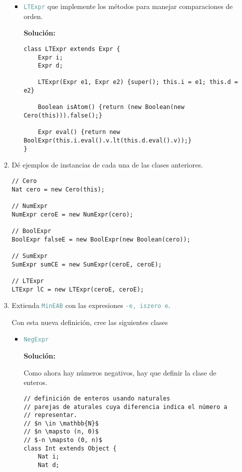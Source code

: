 \documentclass{article}
\newcommand{\tp}[1]{\textcolor{CadetBlue} {\texttt{#1}}}
\newcommand{\tb}[1]{\textcolor{RoyalPurple} {\textbf{#1}}}
\begin{document}
\begin{enumerate}
\begin{enumerate}
\begin{itemize}
                \item \tp{LTExpr} que implemente los métodos para manejar
                comparaciones de orden.

                \tb{Solución:}

                \begin{verbatim}
class LTExpr extends Expr {
    Expr i;
    Expr d;

    LTExpr(Expr e1, Expr e2) {super(); this.i = e1; this.d = e2}

    Boolean isAtom() {return (new Boolean(new Cero(this))).false();}

    Expr eval() {return new BoolExpr(this.i.eval().v.lt(this.d.eval().v));}
}
                \end{verbatim}

            \end{itemize}

            \item Dé ejemplos de instancias de cada una de las clases
            anteriores.

            \begin{verbatim}
// Cero
Nat cero = new Cero(this);

// NumExpr
NumExpr ceroE = new NumExpr(cero);

// BoolExpr
BoolExpr falseE = new BoolExpr(new Boolean(cero));

// SumExpr
SumExpr sumCE = new SumExpr(ceroE, ceroE);

// LTExpr
LTExpr lC = new LTExpr(ceroE, ceroE);
            \end{verbatim}

            \item Extienda \tp{MinEAB} con las expresiones \tp{-e, iszero e}.

            Con esta nueva definición, cree las siguientes clases

            \begin{itemize}
                \item \tp{NegExpr}

                \tb{Solución:}

                Como ahora hay números negativos, hay que definir la clase de
                enteros.

                \begin{verbatim}
// definición de enteros usando naturales
// parejas de aturales cuya diferencia indica el número a
// representar.
// $n \in \mathbb{N}$
// $n \mapsto (n, 0)$
// $-n \mapsto (0, n)$
class Int extends Object {
    Nat i;
    Nat d;


\end{verbatim}
\end{itemize}
\end{enumerate}
\end{enumerate}
\end{document}
